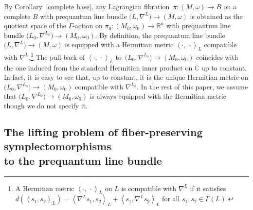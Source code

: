 \documentclass[10pt,a4paper]{amsart}
\numberwithin{equation}{section}
\newcommand{\C}{\mathbb{C}}
\newcommand{\R}{\mathbb{R}}
\def\<{\left\langle}
\def\>{\right\rangle}
\begin{document}
\begin{Remark}\label{Hermitian metric}
By Corollary~\ref{complete base}, any Lagrangian fibration~${\pi\colon (M,\omega)\to B}$ on a complete $B$ with prequantum line bundle $\bigl(L,\nabla^L\bigr)\to (M,\omega)$ is obtained as the quotient space of the $\Gamma$-action on $\pi_0\colon (M_0,\omega_0)\to \R^n$ with prequantum line bundle $\bigl( L_0, \nabla^{L_0}\bigr)
\to (M_0,\omega_0)$. By definition, the prequantum line bundle $\bigl(L,\nabla^L\bigr)\to (M,\omega)$ is equipped with a Hermitian metric $ \< \cdot , \, \cdot \>_L$ compatible with $\nabla^L$.\footnote{A Hermitian metric $ \< \cdot , \, \cdot \>_L$ on $L$ is compatible with $\nabla^L$ if it satisfies $d (\< s_1, s_2\>_L)=\<\nabla^L s_1, s_2\>_L +\< s_1, \nabla^L s_2\>_L$ for all $s_1, s_2\in \Gamma ( L)$. } The pull-back of $ \< \cdot , \, \cdot \>_L$ to~${\bigl( L_0, \nabla^{L_0}\bigr)\to (M_0,\omega_0)}$
coincides with the one induced from the standard Hermitian inner product on $\C$ up to constant. In fact, it is easy to see that, up to constant, it is the unique Hermitian metric on $\bigl( L_0, \nabla^{L_0}\bigr)\to (M_0,\omega_0)$
compatible with $\nabla^{L_0}$.
In the rest of this paper, we assume that $\bigl( L_0, \nabla^{L_0}\bigr)\to (M_0,\omega_0)$
is always equipped with the Hermitian metric though we do not specify it.
\end{Remark}


\subsection[The lifting problem of fiber-preserving symplectomorphisms to the prequantum line bundle]{The lifting problem of fiber-preserving symplectomorphisms \\ to the prequantum line bundle}
\end{document}
